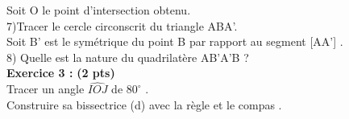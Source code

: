 \documentclass{exam}
\begin{document}
\begin{questions}
Soit O le point d’intersection obtenu.\\[0.2cm]
7)Tracer le cercle circonscrit du triangle ABA'.\\[0.2cm]
Soit B' est le symétrique du point B par rapport au segment [AA'] .\\[0.2cm]
8) Quelle est la nature du quadrilatère AB'A'B ?
\\[0.2cm]
\makebox[1\textwidth]{\enspace\hrulefill}
\question \textbf{Exercice 3 :} 
\textbf{(2 pts)} 
\\[0.2cm]
Tracer un angle $ \widehat{IOJ} $ de  $ 80^{\circ}$ .\\
Construire sa bissectrice (d) avec la règle et le compas .
\end{questions}
\end{document}
